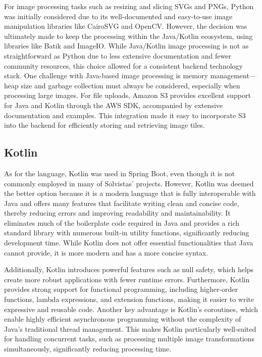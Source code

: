 For image processing tasks such as resizing and slicing SVGs and PNGs, Python was initially considered due to its well-documented and easy-to-use image manipulation libraries like CairoSVG and OpenCV. However, the decision was ultimately made to keep the processing within the Java/Kotlin ecosystem, using libraries like Batik and ImageIO. While Java/Kotlin image processing is not as straightforward as Python due to less extensive documentation and fewer community resources, this choice allowed for a consistent backend technology stack. One challenge with Java-based image processing is memory management—heap size and garbage collection must always be considered, especially when processing large images. For file uploads, Amazon S3 provides excellent support for Java and Kotlin through the AWS SDK, accompanied by extensive documentation and examples. This integration made it easy to incorporate S3 into the backend for efficiently storing and retrieving image tiles.

\subsection{Kotlin}
As for the language, Kotlin was used in Spring Boot, even though it is not commonly employed in many of Solvistas' projects. However, Kotlin was deemed the better option because it is a modern language that is fully interoperable with Java and offers many features that facilitate writing clean and concise code, thereby reducing errors and improving readability and maintainability. It eliminates much of the boilerplate code required in Java and provides a rich standard library with numerous built-in utility functions, significantly reducing development time. While Kotlin does not offer essential functionalities that Java cannot provide, it is more modern and has a more concise syntax.

Additionally, Kotlin introduces powerful features such as null safety, which helps create more robust applications with fewer runtime errors. Furthermore, Kotlin provides strong support for functional programming, including higher-order functions, lambda expressions, and extension functions, making it easier to write expressive and reusable code. Another key advantage is Kotlin’s coroutines, which enable highly efficient asynchronous programming without the complexity of Java’s traditional thread management. This makes Kotlin particularly well-suited for handling concurrent tasks, such as processing multiple image transformations simultaneously, significantly reducing processing time.

